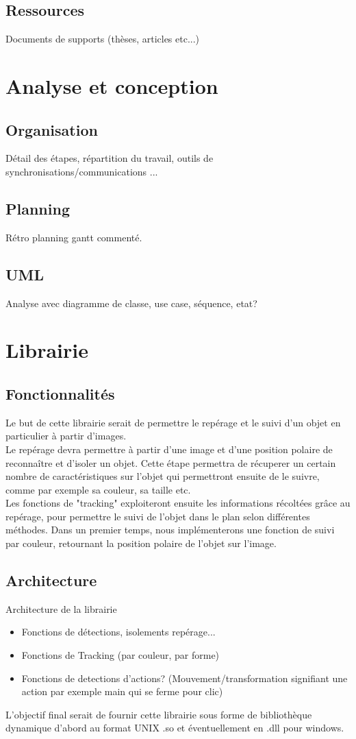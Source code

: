 \documentclass{article}
\begin{document}
		\subsection{Ressources}
			Documents de supports (thèses, articles etc...)
	\section{Analyse et conception}
		\subsection{Organisation}
			Détail des étapes, répartition du travail, outils de synchronisations/communications ...
		\subsection{Planning}
			Rétro planning gantt commenté.
		\subsection{UML}
			Analyse avec diagramme de classe, use case, séquence, etat?
\newpage
	\section{Librairie}
		\subsection{Fonctionnalités}
			Le but de cette librairie serait de permettre le repérage et le suivi d'un objet en particulier à partir d'images. \\
			Le repérage devra permettre à partir d'une image et d'une position polaire de reconnaître et d'isoler un objet. Cette étape permettra de récuperer un certain nombre de caractéristiques sur l'objet qui permettront ensuite de le suivre, comme par exemple sa couleur, sa taille etc. \\
			Les fonctions de "tracking" exploiteront ensuite les informations récoltées grâce au repérage, pour permettre le suivi de l'objet dans le plan selon différentes méthodes.
Dans un premier temps, nous implémenterons une fonction de suivi par couleur, retournant la position polaire de l'objet sur l'image. \\ 
		\subsection{Architecture}
			Architecture de la librairie 
			\begin{itemize}
			\item Fonctions de détections, isolements repérage...
			\item Fonctions de Tracking (par couleur, par forme)
			\item Fonctions de detections d'actions? (Mouvement/transformation signifiant une action par exemple main qui se ferme pour clic)
			\end{itemize}
			L'objectif final serait de fournir cette librairie sous forme de bibliothèque dynamique d'abord au format UNIX .so et éventuellement en .dll pour windows. 
\end{document}
